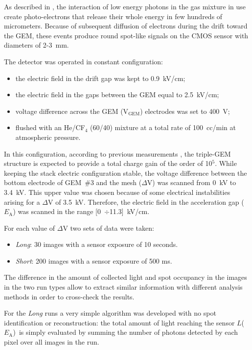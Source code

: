 \documentclass[a4paper,11pt]{article}
\newcommand{\Ea}  {$E_{\mathrm{A}}$}
\newcommand{\La}  {$L$(\Ea)}
\newcommand{\Vg}  {V$_{\mathrm{GEM}}$}
\begin{document}
As described in \cite{bib:fe55}, the interaction of low energy photons in the gas mixture in use create photo-electrons that release their whole energy in few hundreds of micrometers. Because of subsequent diffusion of electrons during the drift toward the GEM, these events produce round spot-like signals on the CMOS sensor with diameters of 2-3~mm.

The detector was operated in constant configuration: 
\begin{itemize}
    \item the electric field in the drift gap was kept to 0.9~kV/cm;
    \item the electric field in the gaps between the GEM equal to 2.5~kV/cm;
    \item voltage difference across the GEM (\Vg) electrodes was set to 400~V;
    \item flushed with an He/CF$_4$ (60/40) mixture at a total rate of 100~cc/min at atmospheric pressure.
\end{itemize}

In this configuration, according to previous measurements \cite{bib:ieee_orange}, the triple-GEM structure is expected to provide a total charge gain of the order of 10$^5$.
While keeping the stack electric configuration stable, the voltage difference between the bottom electrode of GEM~\#3 and the mesh ($\Delta$V) was scanned from 0~kV to 3.4~kV. This upper value was chosen because of some electrical instabilities arising for a $\Delta$V of 3.5~kV.
Therefore, the electric field in the acceleration gap (\Ea) was scanned in the range [0~$\div$11.3]~kV/cm. 

For each value of $\Delta$V two sets of data were taken:

\begin{itemize}
    \item {\it Long}: 30 images with a sensor exposure of 10 seconds. 
    \item {\it Short}: 200 images with a sensor exposure of 500 ms. 
\end{itemize}

The difference in the amount of collected light and spot occupancy in the images in the two run types allow to extract similar information with different analysis methods in order to cross-check the results.

For the {\it Long} runs a very simple algorithm was developed with no spot identification or reconstruction: the total amount of light reaching the sensor \La\ is simply evaluated by summing the number of photons detected by each pixel over all images in the run.
\end{document}
